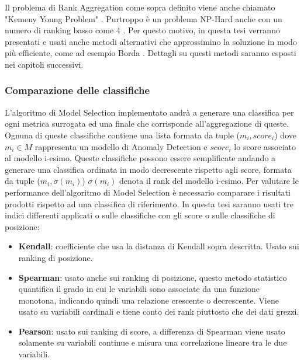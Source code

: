 Il problema di Rank Aggregation come sopra definito viene anche chiamato "Kemeny Young Problem" \cite{pmlr-v54-korba17a}. Purtroppo è un problema NP-Hard anche con un numero di ranking basso come 4 \cite{inproceedingsrankagg}. Per questo motivo, in questa tesi verranno presentati e usati anche metodi alternativi che approssimino la soluzione in modo più efficiente, come ad esempio Borda \cite{borda}. Dettagli su questi metodi saranno esposti nei capitoli successivi.

\subsubsection{Comparazione delle classifiche}
L'algoritmo di Model Selection implementato andrà a generare una classifica per ogni metrica surrogata ed una finale che corrisponde all'aggregazione di queste. Ognuna di queste classifiche contiene una lista formata da tuple (\(m_i, score_i\)) dove $m_i \in M $ rappresenta un modello di Anomaly Detection e $score_i$ lo score associato al modello i-esimo.
Queste classifiche possono essere semplificate andando a generare una classifica ordinata in modo decrescente rispetto agli score, formata da tuple (\(m_i, \sigma(m_i)\)) $\sigma(m_i)$ denota il rank del modello i-esimo.
Per valutare le performance dell'algoritmo di Model Selection è necessario comparare i risultati prodotti rispetto ad una classifica di riferimento.
In questa tesi saranno usati tre indici differenti applicati o sulle classifiche con gli score o sulle classifiche di posizione:

\begin{itemize}
	\item \textbf{Kendall}: coefficiente che usa la distanza di Kendall sopra descritta. Usato sui ranking di posizione.
	\item \textbf{Spearman}: usato anche sui ranking di posizione, questo metodo statistico quantifica il grado in cui le variabili sono associate da una funzione monotona, indicando quindi una relazione crescente o decrescente. Viene usato su variabili cardinali e tiene conto dei rank piuttosto che dei dati grezzi.
	\item \textbf{Pearson}: usato sui ranking di score, a differenza di Spearman viene usato solamente su variabili continue e misura una correlazione lineare tra le due variabili.
\end{itemize}
